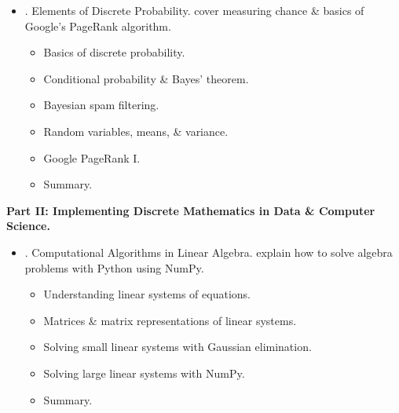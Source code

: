\documentclass{article}
\newtheorem{theorem}{Theorem}
\begin{document}
\begin{enumerate}
\begin{itemize}
\begin{itemize}
\begin{itemize}
				Sometimes, wish to count a slightly different type of permutation; e.g., example with playlists, suppose we want to randomly play only half playlist of 20 songs. Then, how many distinct permutations of a subset of 10 of 20 ares are there?
				
				\begin{theorem}
					Number of permutations of $k$ out of $n$ distinct elements from a set, or $k$-permutations: $P_k = \frac{n!}{(n - k)!}$.
				\end{theorem}
			\end{itemize}
			\item {\sf Applications to memory allocation.}
			\item {\sf Efficacy of brute-force algorithms.}
			\item {\sf Summary.}
		\end{itemize}
		\item {. Elements of Discrete Probability.} cover measuring chance \& basics of Google's PageRank algorithm.
		\begin{itemize}
			\item {\sf Basics of discrete probability.}
			\item {\sf Conditional probability \& Bayes' theorem.}
			\item {\sf Bayesian spam filtering.}
			\item {\sf Random variables, means, \& variance.}
			\item {\sf Google PageRank I.}
			\item {\sf Summary.}
		\end{itemize}
	\end{itemize}
	{\bf Part II: Implementing Discrete Mathematics in Data \& Computer Science.}
	\begin{itemize}
		\item {. Computational Algorithms in Linear Algebra.} explain how to solve algebra problems with Python using NumPy.
		\begin{itemize}
			\item {\sf Understanding linear systems of equations.}
			\item {\sf Matrices \& matrix representations of linear systems.}
			\item {\sf Solving small linear systems with Gaussian elimination.}
			\item {\sf Solving large linear systems with NumPy.}
			\item {\sf Summary.}
		\end{itemize}

\end{itemize}
\end{enumerate}
\end{document}
